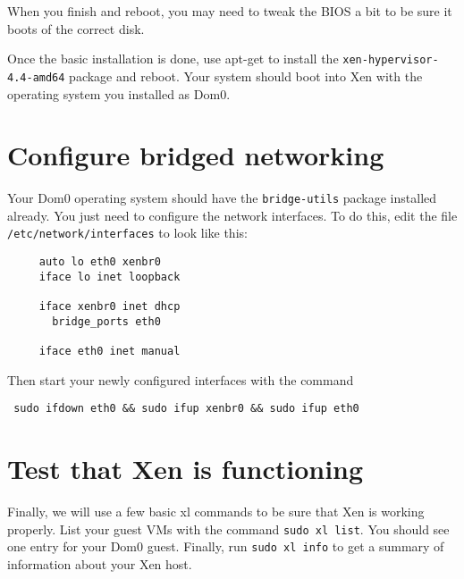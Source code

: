\documentclass{article}
\begin{document}
 When you finish and reboot, you may need to tweak the BIOS a bit to be sure it boots of the correct disk.
 
 Once the basic installation is done, use apt-get to install the \texttt{xen-hypervisor-4.4-amd64} package and reboot. Your system should boot into Xen with the operating system you installed as Dom0.
 
 \section{Configure bridged networking}
 Your Dom0 operating system should have the \texttt{bridge-utils} package installed already. You just need to configure the network interfaces. 
 To do this, edit the file \texttt{/etc/network/interfaces} to look like this:
 
 \begin{verbatim}
     auto lo eth0 xenbr0
     iface lo inet loopback

     iface xenbr0 inet dhcp
       bridge_ports eth0

     iface eth0 inet manual
\end{verbatim}

Then start your newly configured interfaces with the command

 \begin{verbatim}
 sudo ifdown eth0 && sudo ifup xenbr0 && sudo ifup eth0
 \end{verbatim}
 
 \section{Test that Xen is functioning}
 Finally, we will use a few basic xl commands to be sure that Xen is working properly. List your guest VMs with the command
 \texttt{sudo xl list}. You should see one entry for your Dom0 guest. Finally, run \texttt{sudo xl info} to get a summary of information 
 about your Xen host. 
 
 
\end{document}
